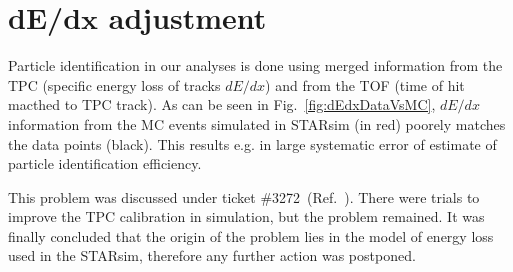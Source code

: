 

\chapter{\texorpdfstring{d$\bm{E}$/d$\bm{x}$}{dE/dx} adjustment}\label{chap:dEdxCorrection}

Particle identification in our analyses is done using merged information from the TPC (specific energy loss of tracks $dE/dx$) and from the TOF (time of hit macthed to TPC track). As can be seen in Fig.~\ref{fig:dEdxDataVsMC}, $dE/dx$ information from the MC events simulated in STARsim (in red) poorely matches the data points (black). This results e.g. in large systematic error of estimate of particle identification efficiency.

This problem was discussed under ticket \#3272~(Ref.~\cite{dedxTicket}). There were trials to improve the TPC calibration in simulation, but the problem remained. It was finally concluded that the origin of the problem lies in the model of energy loss used in the STARsim, therefore any further action was postponed. 

